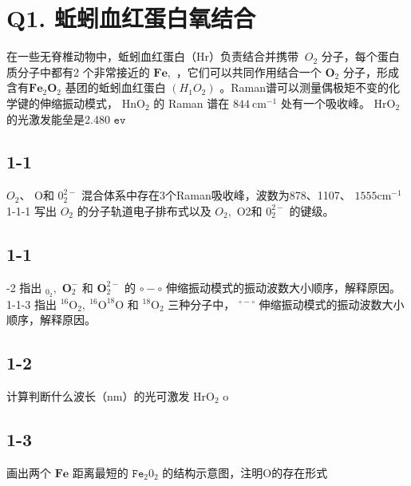 \section*{Q1. 蚯蚓血红蛋白氧结合}
在一些无脊椎动物中，蚯蚓血红蛋白（Hr）负责结合并携带 $\ O _ { 2 }$ 分子，每个蛋白质分子中都有2 个非常接近的 $\mathbf { F e } ,$ ，它们可以共同作用结合一个 $\mathbf { O } _ { 2 }$ 分子，形成含有$\mathbf { F e } _ { 2 } \mathbf { O } _ { 2 }$ 基团的蚯蚓血红蛋白 $( H _ { 1 } O _ { 2 } )$ 。Raman谱可以测量偶极矩不变的化学键的伸缩振动模式， $\mathrm { H n O } _ { 2 }$ 的 Raman 谱在 $8 4 4 ~ \mathrm { c m } ^ { - 1 }$ 处有一个吸收峰。 $\mathrm { H r O } _ { 2 }$ 的光激发能垒是2.480 $\mathtt { e v }$

\subsection*{1-1}
$O _ { 2 } 、$ O和 $0 _ { 2 } ^ { 2 - }$ 混合体系中存在3个Raman吸收峰，波数为878、1107、 $1 5 5 5 \mathrm { c m } ^ { - 1 }$ 1-1-1 写出 $O _ { 2 }$ 的分子轨道电子排布式以及 $O _ { 2 } ,$ O2和 $0 _ { 2 } ^ { 2 - }$ 的键级。

\subsection*{1-1}
-2 指出 $_ { 0 _ { 2 } } ,$ $\mathbf { O } _ { 2 } ^ { - }$ 和 $\mathbf { O } _ { 2 } ^ { 2 - }$ 的 $\circ { - } \circ$ 伸缩振动模式的振动波数大小顺序，解释原因。1-1-3 指出 $^ { 1 6 } \mathrm { O } _ { 2 } , \ ^ { 1 6 } \mathrm { O } ^ { 1 8 } \mathrm { O }$ 和 $^ { 1 8 } \mathrm { O } _ { 2 }$ 三种分子中， $^ { \circ - \circ }$ 伸缩振动模式的振动波数大小顺序，解释原因。

\subsection*{1-2}
计算判断什么波长（nm）的光可激发 $\mathrm { H r O } _ { 2 }$ o

\subsection*{1-3}
画出两个 $\mathbf { F e }$ 距离最短的 $\mathtt { F e } _ { 2 } 0 _ { 2 }$ 的结构示意图，注明O的存在形式
